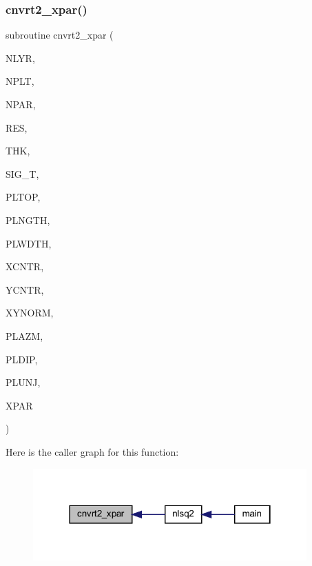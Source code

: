 \subsubsection{\texorpdfstring{cnvrt2\+\_\+xpar()}{cnvrt2\_xpar()}}
{\footnotesize\ttfamily subroutine cnvrt2\+\_\+xpar (\begin{DoxyParamCaption}\item[{integer}]{N\+L\+YR,  }\item[{integer}]{N\+P\+LT,  }\item[{integer}]{N\+P\+AR,  }\item[{real, dimension(nlyr)}]{R\+ES,  }\item[{real, dimension(nlyr)}]{T\+HK,  }\item[{real, dimension(nplt)}]{S\+I\+G\+\_\+T,  }\item[{real, dimension(nplt)}]{P\+L\+T\+OP,  }\item[{real, dimension(nplt)}]{P\+L\+N\+G\+TH,  }\item[{real, dimension(nplt)}]{P\+L\+W\+D\+TH,  }\item[{real, dimension(nplt)}]{X\+C\+N\+TR,  }\item[{real, dimension(nplt)}]{Y\+C\+N\+TR,  }\item[{real, dimension(nplt)}]{X\+Y\+N\+O\+RM,  }\item[{real, dimension(nplt)}]{P\+L\+A\+ZM,  }\item[{real, dimension(nplt)}]{P\+L\+D\+IP,  }\item[{real, dimension(nplt)}]{P\+L\+U\+NJ,  }\item[{real, dimension(npar)}]{X\+P\+AR }\end{DoxyParamCaption})}

Here is the caller graph for this function\+:\nopagebreak
\begin{figure}[H]
\begin{center}
\leavevmode
\includegraphics[width=298pt]{Leroi_8f90_aa8246fcc58fb68567634de3315aa33d2_icgraph}
\end{center}
\end{figure}
\mbox{\label{Leroi_8f90_a0801b4ca30057cb8ddfb94e49185a2ce}} 
